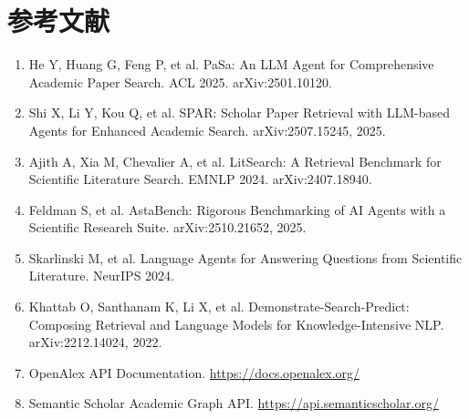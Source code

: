 \documentclass[a4paper,11pt]{ctexart}
\begin{document}
\section*{参考文献}
\begin{enumerate}[leftmargin=2em]
\item He Y, Huang G, Feng P, et al. PaSa: An LLM Agent for Comprehensive Academic Paper Search. ACL 2025. arXiv:2501.10120.
\item Shi X, Li Y, Kou Q, et al. SPAR: Scholar Paper Retrieval with LLM-based Agents for Enhanced Academic Search. arXiv:2507.15245, 2025.
\item Ajith A, Xia M, Chevalier A, et al. LitSearch: A Retrieval Benchmark for Scientific Literature Search. EMNLP 2024. arXiv:2407.18940.
\item Feldman S, et al. AstaBench: Rigorous Benchmarking of AI Agents with a Scientific Research Suite. arXiv:2510.21652, 2025.
\item Skarlinski M, et al. Language Agents for Answering Questions from Scientific Literature. NeurIPS 2024.
\item Khattab O, Santhanam K, Li X, et al. Demonstrate-Search-Predict: Composing Retrieval and Language Models for Knowledge-Intensive NLP. arXiv:2212.14024, 2022.
\item OpenAlex API Documentation. \url{https://docs.openalex.org/}
\item Semantic Scholar Academic Graph API. \url{https://api.semanticscholar.org/}
\end{enumerate}
\end{document}
